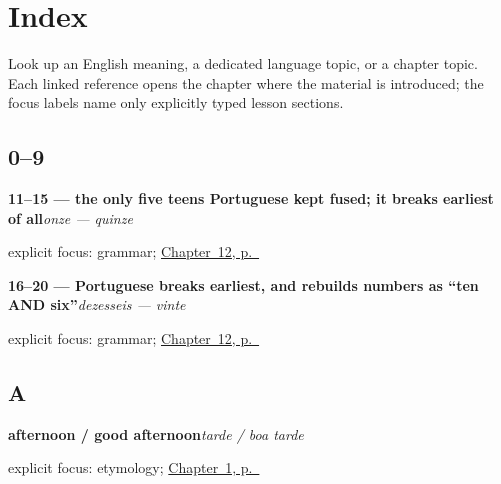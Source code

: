 
\chapter*{Index}

Look up an English meaning, a dedicated language topic, or a chapter topic. Each linked reference opens the chapter where the material is introduced; the focus labels name only explicitly typed lesson sections.

\section*{0--9}

\noindent\begin{minipage}[t]{\linewidth}
\raggedright
\textbf{11–15 — the only five teens Portuguese kept fused; it breaks earliest of all}\enspace\emph{onze — quinze}\par
\footnotesize explicit focus: grammar; \hyperref[ch:pt-numbers-eleven-to-twenty]{Chapter~12, p.~\pageref*{ch:pt-numbers-eleven-to-twenty}}
\end{minipage}\par\smallskip

\noindent\begin{minipage}[t]{\linewidth}
\raggedright
\textbf{16–20 — Portuguese breaks earliest, and rebuilds numbers as \textquotedblleft{}ten AND six\textquotedblright{}}\enspace\emph{dezesseis — vinte}\par
\footnotesize explicit focus: grammar; \hyperref[ch:pt-numbers-eleven-to-twenty]{Chapter~12, p.~\pageref*{ch:pt-numbers-eleven-to-twenty}}
\end{minipage}\par\smallskip

\section*{A}

\noindent\begin{minipage}[t]{\linewidth}
\raggedright
\textbf{afternoon / good afternoon}\enspace\emph{tarde / boa tarde}\par
\footnotesize explicit focus: etymology; \hyperref[ch:greetings]{Chapter~1, p.~\pageref*{ch:greetings}}
\end{minipage}\par\smallskip

